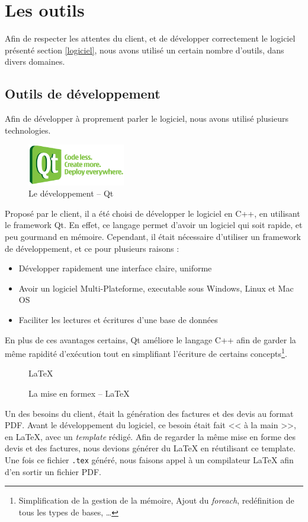 \section{Les outils}
Afin de respecter les attentes du client, et de développer correctement le logiciel présenté section \ref{logiciel}, nous avons utilisé un
certain nombre d'outils, dans divers domaines.

\subsection{Outils de développement}
Afin de développer à proprement parler le logiciel, nous avons utilisé plusieurs technologies. 

\begin{figure}
\begin{center}
\includegraphics[width=0.38\textwidth]{../beamer/logos/qt.png}
\end{center}
\caption{Le développement -- Qt}
\end{figure}
Proposé par le client, il a été choisi de développer le logiciel en C++, en utilisant le framework Qt. 
En effet, ce langage permet d'avoir un logiciel qui soit rapide, et peu gourmand en mémoire. Cependant, il était nécessaire d'utiliser un
framework de développement, et ce pour plusieurs raisons : 
\begin{itemize}
	\item Développer rapidement une interface claire, uniforme
	\item Avoir un logiciel Multi-Plateforme, executable sous Windows, Linux et Mac OS
	\item Faciliter les lectures et écritures d'une base de données 
\end{itemize}
En plus de ces avantages certains, Qt améliore le langage C++ afin de garder la même rapidité d'exécution tout en simplifiant l'écriture de
certains concepts\footnote{Simplification de la gestion de la mémoire, Ajout du \textit{foreach}, redéfinition de tous les types de bases, …}.

\newpage
\begin{figure}
\begin{center}
	\Huge \LaTeX
\end{center}
\caption{La mise en formex -- \LaTeX}
\end{figure}
Un des besoins du client, était la génération des factures et des devis au format PDF. Avant le développement du logiciel, ce besoin était
fait << à la main >>, en \LaTeX{}, avec un \textit{template} rédigé. Afin de regarder la même mise en forme des devis et des factures, nous
devions générer du \LaTeX{} en réutilisant ce template.\\ Une fois ce fichier \texttt{.tex} généré, nous faisons appel à un compilateur \LaTeX{} afin d'en sortir un fichier PDF.

